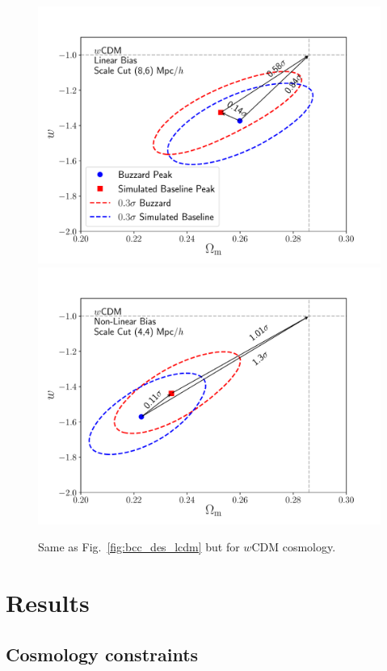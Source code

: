 \documentclass[fleqn,usenatbib]{mnras}
\begin{document}
\begin{figure}
\includegraphics[width=\columnwidth]{figs/Buzzard_linbias86_2x2pt_wcdm.pdf}
\includegraphics[width=\columnwidth]{figs/Buzzard_nlbias44_2x2pt_wcdm.pdf}
\caption[]{Same as Fig.~\ref{fig:bcc_des_lcdm} but for $w$CDM cosmology.
}
\label{fig:bcc_des_wcdm}
\end{figure}


\section{Results}

\subsection{Cosmology constraints}
\end{document}
